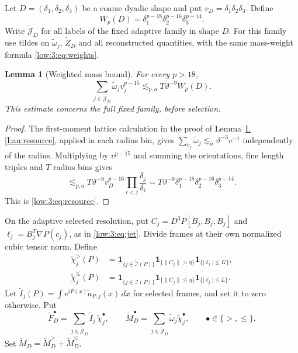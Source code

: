 \documentclass[11pt]{amsart}
\newtheorem{lemma}[theorem]{Lemma}
\theoremstyle{definition}
\theoremstyle{remark}
\newcommand{\norm}[1]{\lVert #1\rVert}
\newcommand{\abs}[1]{\lvert #1\rvert}
\numberwithin{equation}{section}
\newcommand{\partIref}[1]{\hyperref[I:#1]{I.\ref*{I:#1}}}
\begin{document}
Let $D=(\delta_1,\delta_2,\delta_3)$ be a coarse dyadic shape and put $v_D=\delta_1\delta_2\delta_3$. Define
\begin{equation}\label{low:3:eq:W}
W_p(D)=\delta_1^{p-18}\delta_2^{p-16}\delta_3^{p-14}.
\end{equation}
Write $\widetilde{\mathcal J}_D$ for all labels of the fixed adaptive family in shape $D$. For this family use tildes on $\widetilde\omega_j$, $\widetilde Z_D$ and all reconstructed quantities, with the same mass-weight formula \eqref{low:3:eq:weights}.

\begin{lemma}[Weighted mass bound]\label{low:3:lem:resource}
For every $p>18$,
\begin{equation}\label{low:3:eq:resource}
\sum_{j\in\widetilde{\mathcal J}_D}\widetilde\omega_jv_j^{p-15}\lesssim_{p,a} T\vartheta^{-9}W_p(D).
\end{equation}
This estimate concerns the full fixed family, before selection.
\end{lemma}

\begin{proof}
The first-moment lattice calculation in the proof of Lemma~\partIref{an:resource}, applied in each radius bin, gives $\sum_{c_j}\widetilde\omega_j\lesssim_a \vartheta^{-3}v^{-1}$ independently of the radius. Multiplying by $v^{p-15}$ and summing the orientations, fine length triples and $T$ radius bins gives
\[
\lesssim_{p,a}T\vartheta^{-9}v_D^{p-16}\prod_{i<j}\frac{\delta_j}{\delta_i}=T\vartheta^{-9}\delta_1^{p-18}\delta_2^{p-16}\delta_3^{p-14}.
\]
This is \eqref{low:3:eq:resource}.
\end{proof}

On the adaptive selected resolution, put $C_j=D^3P[B_j,B_j,B_j]$ and $\ell_j=B_j^T\nabla P(c_j)$, as in \eqref{low:3:eq:jet}. Divide frames at their own normalized cubic tensor norm. Define
\begin{align}\label{low:3:eq:new-selectors}
\widetilde\chi_j^{>}(P)&=\mathbf 1_{\{j\in\widetilde{\mathcal I}(P)\}}\mathbf 1_{\{\norm{C_j}>\eta\}}\mathbf 1_{\{\abs{\ell_j}\leq K\}},\\
\widetilde\chi_j^{\leq}(P)&=\mathbf 1_{\{j\in\widetilde{\mathcal I}(P)\}}\mathbf 1_{\{\norm{C_j}\leq\eta\}}\mathbf 1_{\{\abs{\ell_j}\leq L\}}.\nonumber
\end{align}
Let $\widetilde I_j(P)=\int e^{iP(x)}\widetilde a_{P,j}(x)\,dx$ for selected frames, and set it to zero otherwise. Put
\begin{equation}\label{low:3:eq:new-F}
\widetilde F_D^\bullet=\sum_{j\in\widetilde{\mathcal J}_D}\widetilde I_j\,\widetilde\chi_j^\bullet,\qquad
\widetilde M_D^\bullet=\sum_{j\in\widetilde{\mathcal J}_D}\widetilde\omega_j\widetilde\chi_j^\bullet,\qquad \bullet\in\{>,\leq\}.
\end{equation}
Set $\widetilde M_D=\widetilde M_D^>+\widetilde M_D^{\leq}$.
\end{document}
